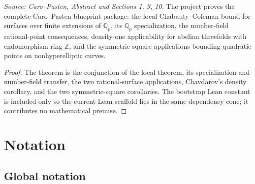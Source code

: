 \begin{theorem}
  \label{thm:cp_project_goal}
  \textit{Source: Caro--Pasten, Abstract and Sections 1, 9, 10.}
  The project proves the complete Caro--Pasten blueprint package: the local
  Chabauty--Coleman bound for surfaces over finite extensions of
  \(\mathbb Q_p\), its \(\mathbb Q_p\) specialization, the number-field
  rational-point consequences, density-one applicability for abelian
  threefolds with endomorphism ring \(\mathbb Z\), and the symmetric-square
  applications bounding quadratic points on nonhyperelliptic curves.
\end{theorem}
\begin{proof}
  The theorem is the conjunction of the local theorem, its specialization and
  number-field transfer, the two rational-surface applications, Chavdarov's
  density corollary, and the two symmetric-square corollaries.  The bootstrap
  Lean constant is included only so the current Lean scaffold lies in the same
  dependency cone; it contributes no mathematical premise.
\end{proof}

\section{Notation}

\subsection{Global notation}

